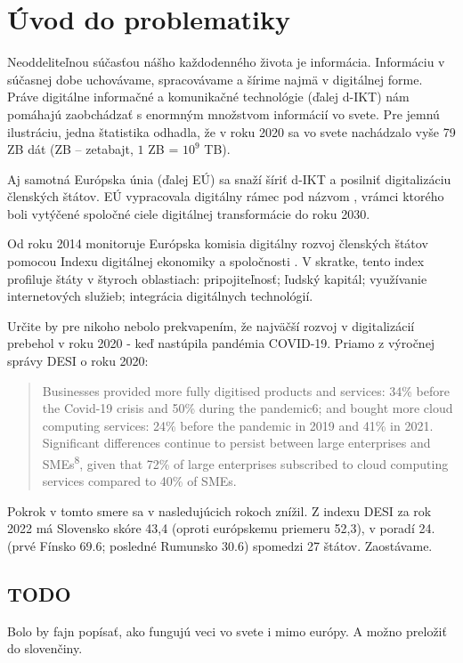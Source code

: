 \chapter{Úvod do problematiky}
Neoddeliteľnou súčasťou nášho každodenného života je informácia. Informáciu v súčasnej dobe uchovávame, spracovávame a 
šírime najmä v digitálnej forme. Práve digitálne informačné a komunikačné technológie (ďalej d-IKT) nám pomáhajú 
zaobchádzať s enormným množstvom informácií vo svete. Pre jemnú ilustráciu, jedna štatistika \cite{STATISTA} odhadla, 
že v roku 2020 sa vo svete nachádzalo vyše 79 ZB dát (ZB -- zetabajt, $1$ ZB = $10^9$ TB).


Aj samotná Európska únia (ďalej EÚ) sa snaží šíriť d-IKT a posilniť digitalizáciu členských štátov. EÚ vypracovala
digitálny rámec pod názvom , vrámci ktorého boli vytýčené spoločné ciele digitálnej 
transformácie do roku 2030.

Od roku 2014 monitoruje Európska komisia digitálny rozvoj členských štátov pomocou Indexu digitálnej ekonomiky a
spoločnosti
\cite{DESI22}. V skratke, tento index profiluje štáty v štyroch oblastiach: pripojiteľnosť; ľudský kapitál; 
využívanie internetových služieb; integrácia digitálnych technológií.

Určite by pre nikoho nebolo prekvapením, že najväčší rozvoj v digitalizácií prebehol v roku 2020 - keď nastúpila pandémia COVID-19.
Priamo z výročnej správy DESI\cite{DESI22} o roku 2020:
\begin{quote}
  Businesses provided more fully digitised products and
  services: 34\% before the Covid-19 crisis and 50\% during the pandemic6; and bought more cloud
  computing services: 24\% before the pandemic in 2019 and 41\% in 2021. Significant differences
  continue to persist between large enterprises and SMEs\textsuperscript{8}, given that 72\% of large enterprises
  subscribed to cloud computing services compared to 40\% of SMEs.
\end{quote}

Pokrok v tomto smere sa v nasledujúcich rokoch znížil. Z indexu DESI\cite{DESI22} za rok 2022  má Slovensko skóre 43,4
(oproti európskemu priemeru 52,3), v poradí 24. (prvé Fínsko 69.6; posledné Rumunsko 30.6) spomedzi 27 štátov. Zaostávame.

\section*{TODO} 
Bolo by fajn popísať, ako fungujú veci vo svete i mimo európy. A možno preložiť do slovenčiny.


